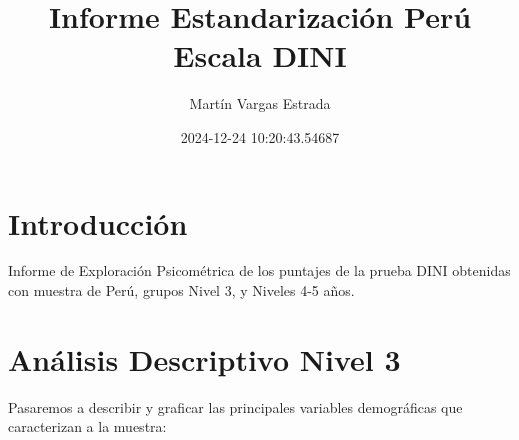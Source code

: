\documentclass[
]{article}
\title{Informe Estandarización Perú Escala DINI}
\author{Martín Vargas Estrada}
\date{2024-12-24 10:20:43.54687}
\begin{document}
\maketitle

{
\setcounter{tocdepth}{2}
\tableofcontents
}
\listoftables
\newpage

\section{Introducción}\label{introducciuxf3n}

Informe de Exploración Psicométrica de los puntajes de la prueba DINI obtenidas con muestra de Perú, grupos Nivel 3, y Niveles 4-5 años.

\section{Análisis Descriptivo Nivel 3}\label{anuxe1lisis-descriptivo-nivel-3}

Pasaremos a describir y graficar las principales variables demográficas que caracterizan a la muestra:
\end{document}

